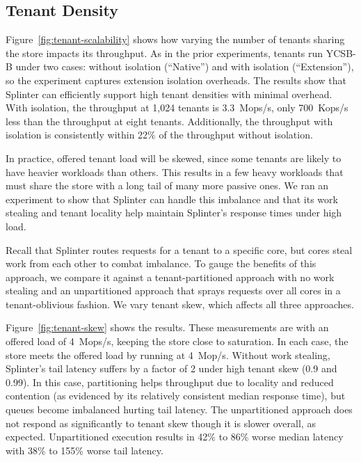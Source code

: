 \subsection{Tenant Density}

Figure~\ref{fig:tenant-scalability} shows how varying the number of tenants
  sharing the store impacts its throughput.
As in the prior experiments, tenants run YCSB-B under two cases:
without isolation (``Native'') and with isolation (``Extension''), so the
experiment captures extension isolation
  overheads.
The results show that Splinter can efficiently support high tenant densities
  with minimal overhead.
With isolation, the throughput at 1,024 tenants is 3.3~Mops/s, only
700~Kops/s less than the throughput at eight tenants. Additionally,
the throughput with isolation is consistently within 22\% of the throughput
without isolation.

In practice, offered tenant load will be skewed, since some tenants are likely
  to have heavier workloads than others.
This results in a few heavy workloads that must share the store with a long
  tail of many more passive ones.
We ran an experiment to show that Splinter can handle this imbalance and
  that its work stealing and tenant locality help maintain Splinter's
  response times under high load.

Recall that Splinter routes requests for a tenant to a specific
  core, but cores steal work from each other to combat imbalance.
To gauge the benefits of this approach, we compare it against a tenant-partitioned
  approach with no work stealing and an unpartitioned approach that sprays
  requests over all cores in a tenant-oblivious fashion.
We vary tenant skew, which affects all three approaches.

Figure~\ref{fig:tenant-skew} shows the results.
These measurements are with an offered load of 4~Mops/s, keeping the
  store close to saturation.
In each case, the store meets the offered load by running at
  4~Mop/s.
Without work stealing, Splinter's tail latency suffers by a factor of 2 under
  high tenant skew (0.9 and 0.99).
In this case, partitioning helps throughput due to locality and reduced
  contention (as evidenced by its relatively consistent median response time),
  but queues become imbalanced hurting tail latency.
The unpartitioned approach does not respond as significantly to tenant skew
  though it is slower overall, as expected.
Unpartitioned execution results in
  42\% to 86\% worse median latency with 38\% to 155\% worse tail latency.

